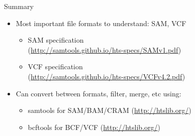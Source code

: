 \documentclass{beamer}
\begin{document}
\begin{frame}{Summary}

  \begin{itemize}
  \item
    Most important file formats to understand: SAM, VCF
    \begin{itemize}
    \item SAM specification \\
    (\url{http://samtools.github.io/hts-specs/SAMv1.pdf})
    \item VCF specification \\
    (\url{http://samtools.github.io/hts-specs/VCFv4.2.pdf})
    \end{itemize}
  \item
    Can convert between formats, filter, merge, etc using: 
    \begin{itemize}
    \item samtools for SAM/BAM/CRAM (\url{http://htslib.org/})
    \item bcftools for BCF/VCF (\url{http://htslib.org/})
    \end{itemize}
  \end{itemize}
  
\end{frame}
\end{document}
